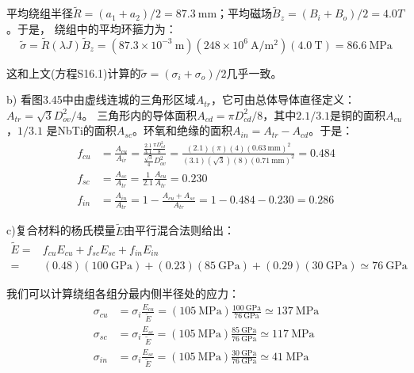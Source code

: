 平均绕组半径$\tilde{R}= (a_1 + a_2)/2=87.3\ \mathrm{mm}$；平均磁场$\tilde{B}_z = (B_i + B_o)/2=4.0 T$。于是，
绕组中的平均环箍力为：
\begin{equation*}
\tilde{\sigma}=\tilde{R}(\lambda J)\tilde{B}_{z}=(87.3\times 10^{-3}\ \mathrm{m})(248\times 10^{6}\ \mathrm{A/m^{2}})(4.0\ \mathrm{T})%
=86.6\ \mathrm{MPa} \tag{S16.2}
\end{equation*}

这和上文(方程S16.1)计算的$\tilde{\sigma}=(\sigma_i+\sigma_o)/2$几乎一致。

b) 看图3.45中由虚线连城的三角形区域$A_{tr}$，它可由总体导体直径定义：$A_{tr} =\sqrt{3} D_{ov}^2/4$。
三角形内的导体面积$A_{cd}= \pi D_{cd}^2/8$，其中$2.1/3.1$是铜的面积$A_{cu}$，$1/3.1$
是NbTi的面积$A_{sc}$。环氧和绝缘的面积$A_{in}= A_{tr} − A_{cd}$。于是：
\begin{align*}
f_{cu}&=\frac{A_{cu}}{A_{ir}}=\frac{\frac{2.1}{3.1}\frac{\pi D_{cd}^{2}}{8}}{\frac{\sqrt{3}}{4}D_{ov}^{2}}=\frac{(2.1)(\pi)(4)(0.63\ \mathrm{mm})^{2}}{(3.1)(\sqrt{3})(8)(0.71\ \mathrm{mm})^{2}}=0.484\tag{S16.3a}\\
f_{sc}&=\frac{A_{sc}}{A_{tr}}=\frac{1}{2.1}\frac{A_{cu}}{A_{tr}}=0.230 \tag{S16.3b}\\
f_{in}&=\frac{A_{in}}{A_{tr}}=1-\frac{A_{cu}+A_{sc}}{A_{tr}}=1-0.484-0.230=0.286 \tag{S16.3c}
\end{align*}

c)复合材料的杨氏模量$\tilde{E}$由平行混合法则给出：
\begin{equation*}
\begin{split}
\tilde{E}=&f_{cu}E_{cu}+f_{sc}E_{sc}+f_{in}E_{in}\\
=&(0.48)(100\ \mathrm{GPa})+(0.23)(85\ \mathrm{GPa})+(0.29)(30 \ \mathrm{GPa})
\simeq 76\ \mathrm{GPa}
\end{split}\tag{S16.4}
\end{equation*}

我们可以计算绕组各组分最内侧半径处的应力：
\begin{align*}
\sigma_{cu}&=\sigma_{i}\frac{E_{cu}}{\tilde{E}}=(105\ \mathrm{MPa})\frac{100\ \mathrm{GPa}}{76\ \mathrm{GPa}}\simeq 137\ \mathrm{MPa} \tag{S16.5a}\\%
\sigma_{sc}&=\sigma_{i}\frac{E_{sc}}{\tilde{E}}=(105\ \mathrm{MPa})\frac{85\ \mathrm{GPa}}{76\ \mathrm{GPa}}\simeq 117\ \mathrm{MPa}\tag{S16.5b}\\%
\sigma_{in}&=\sigma_{i}\frac{E_{sc}}{\tilde{E}}=(105\ \mathrm{MPa})\frac{30\ \mathrm{GPa}}{76\ \mathrm{GPa}}\simeq 41\ \mathrm{MPa}\tag{S16.5c} %
\end{align*}

